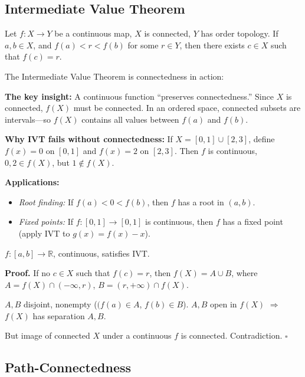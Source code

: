 \documentclass[11pt]{report}
\renewenvironment{proof}[1][Proof]{\noindent\textbf{#1.} }{\hfill$\square$\par\vspace{5pt}}
\begin{document}
\subsection{Intermediate Value Theorem}

\begin{thmbox}
Let $f: X \to Y$ be a continuous map, $X$ is connected, $Y$ has order topology. If $a, b \in X$, and $f(a) < r < f(b)$ for some $r \in Y$, then there exists $c \in X$ such that $f(c) = r$.
\end{thmbox}

\begin{rembox}
The Intermediate Value Theorem is connectedness in action:

\textbf{The key insight:} A continuous function ``preserves connectedness.'' Since $X$ is connected, $f(X)$ must be connected. In an ordered space, connected subsets are intervals---so $f(X)$ contains all values between $f(a)$ and $f(b)$.

\textbf{Why IVT fails without connectedness:} If $X = [0,1] \cup [2,3]$, define $f(x) = 0$ on $[0,1]$ and $f(x) = 2$ on $[2,3]$. Then $f$ is continuous, $0, 2 \in f(X)$, but $1 \notin f(X)$.

\textbf{Applications:}
\begin{itemize}
    \item \textit{Root finding:} If $f(a) < 0 < f(b)$, then $f$ has a root in $(a,b)$.
    \item \textit{Fixed points:} If $f: [0,1] \to [0,1]$ is continuous, then $f$ has a fixed point (apply IVT to $g(x) = f(x) - x$).
\end{itemize}
\end{rembox}

\begin{exbox}
$f: [a, b] \to \mathbb{R}$, continuous, satisfies IVT.
\end{exbox}

\begin{proof}
If no $c \in X$ such that $f(c) = r$, then $f(X) = A \cup B$, where $A = f(X) \cap (-\infty, r)$, $B = (r, +\infty) \cap f(X)$.

$A, B$ disjoint, nonempty ($(f(a) \in A$, $f(b) \in B$). $A, B$ open in $f(X)$ $\Rightarrow$ $f(X)$ has separation $A, B$.

But image of connected $X$ under a continuous $f$ is connected. Contradiction.
\end{proof}

\subsection{Path-Connectedness}
\end{document}
